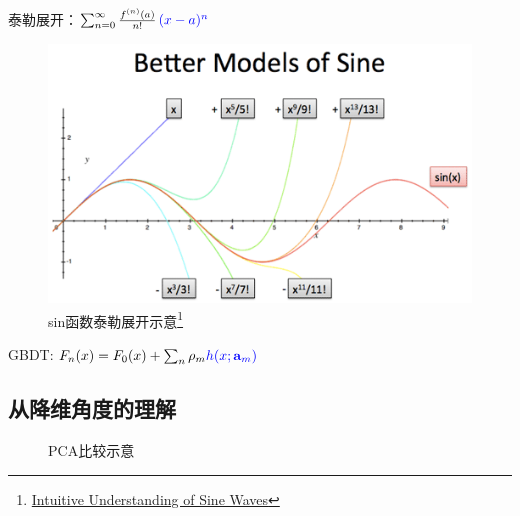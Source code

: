\begin{frame}
    泰勒展开：$\sum _{n=0}^{\infty }{\frac{f^{(n)}(a)}{n!}}\,\textcolor{blue}{(x-a)^{n}}$

    \begin{figure}[!tb]
        \includegraphics[width=\twopicwidth]{figure/gbdt/sine-better-models}
        \caption{sin函数泰勒展开示意\footnote{
                 \href{https://betterexplained.com/articles/intuitive-understanding-of-sine-waves/}{Intuitive Understanding of Sine Waves}}}
    \end{figure}

    GBDT: $F_n(x) = F_{0}(x) + \sum_n \rho_m \textcolor{blue}{h(x; \mathbf{a}_m)}$
\end{frame}


\subsection{从降维角度的理解}
\begin{frame}
    \begin{figure}
        \centering
        \hfil
        \subfigure[][]{
            \resizebox{0.50\linewidth}{!}{}
        }
        \caption{PCA\footnotemark 比较示意}
    \end{figure}

\end{frame}

